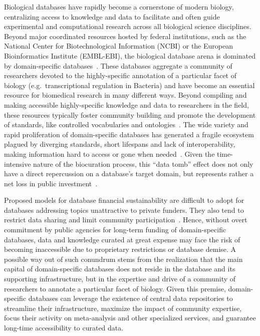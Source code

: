 Biological databases have rapidly become a cornerstone of modern biology,
centralizing access to knowledge and data to facilitate and often guide
experimental and computational research across all biological science
disciplines. Beyond major coordinated resources hosted by federal institutions,
such as the National Center for Biotechnological Information (NCBI) or the
European Bioinformatics Institute (EMBL-EBI), the biological database arena is
dominated by domain-specific databases~\cite{chen2007online,
  chandras2009models, bolser2012metabase, galperin20152015}. These databases
aggregate a community of researchers devoted to the highly-specific annotation
of a particular facet of biology (e.g.\ transcriptional regulation in Bacteria)
and have become an essential resource for biomedical research in many different
ways. Beyond compiling and making accessible highly-specific knowledge and data
to researchers in the field, these resources typically foster community
building and promote the development of standards, like controlled vocabularies
and ontologies~\cite{howe2008big, dunin2006modomics, schindelman2011worm,
  costa2013drosophila}. The wide variety and rapid proliferation of
domain-specific databases has generated a fragile ecosystem plagued by
diverging standards, short lifespans and lack of interoperability, making
information hard to access or gone when needed~\cite{wren2008databases}. Given
the time-intensive nature of the biocuration process, this “data tomb” effect
does not only have a direct repercussion on a database’s target domain, but
represents rather a net loss in public investment~\cite{merali2005databases,
  howe2008big, bastow2010sustainable}.

Proposed models for database financial sustainability are difficult to adopt
for databases addressing topics unattractive to private funders. They also tend
to restrict data sharing and limit community
participation~\cite{chandras2009models, bastow2010sustainable}. Hence, without
overt commitment by public agencies for long-term funding of domain-specific
databases, data and knowledge curated at great expense may face the risk of
becoming inaccessible due to proprietary restrictions or database demise. A
possible way out of such conundrum stems from the realization that the main
capital of domain-specific databases does not reside in the database and its
supporting infrastructure, but in the expertise and drive of a community of
researchers to annotate a particular facet of biology. Given this premise,
domain-specific databases can leverage the existence of central data
repositories to streamline their infrastructure, maximize the impact of
community expertise, focus their activity on meta-analysis and other
specialized services, and guarantee long-time accessibility to curated data.

